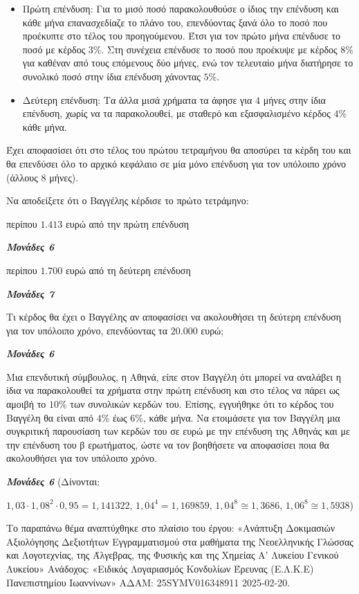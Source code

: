 \documentclass[11pt,a4paper,twoside]{book}
\newcommand{\monades}[1]{
\hspace*{\fill}
\textbf{\textit{\textcolor{maincolor}{Μονάδες #1}}}}
\begin{document}
\begin{itemize}
\item
  Πρώτη επένδυση: Για το μισό ποσό παρακολουθούσε ο ίδιος την επένδυση και κάθε μήνα επανασχεδίαζε το πλάνο του, επενδύοντας ξανά όλο το ποσό που προέκυπτε στο τέλος του προηγούμενου. Έτσι για τον πρώτο μήνα επένδυσε το ποσό με κέρδος $3\%$. Στη συνέχεια επένδυσε το ποσό που προέκυψε με κέρδος $8\%$ για καθέναν από τους επόμενους δύο μήνες, ενώ τον τελευταίο μήνα διατήρησε το συνολικό ποσό στην ίδια επένδυση χάνοντας $5$\%.
\item
  Δεύτερη επένδυση: Τα άλλα μισά χρήματα τα άφησε για $4$ μήνες στην ίδια επένδυση, χωρίς να τα παρακολουθεί, με σταθερό και εξασφαλισμένο κέρδος $4\%$ κάθε μήνα.
\end{itemize}

Έχει αποφασίσει ότι στο τέλος του πρώτου τετραμήνου θα αποσύρει τα κέρδη του και θα επενδύσει όλο το αρχικό κεφάλαιο σε μία μόνο επένδυση για τον υπόλοιπο χρόνο (άλλους $8$ μήνες).

\begin{alist}
\item Να αποδείξετε ότι ο Βαγγέλης κέρδισε το πρώτο τετράμηνο:

\begin{rlist}
\item περίπου $1.413$ ευρώ από την πρώτη επένδυση
\monades{6}
\item περίπου $1.700$ ευρώ από τη δεύτερη επένδυση
\monades{7}
\end{rlist}
\item Τι κέρδος θα έχει ο Βαγγέλης αν αποφασίσει να ακολουθήσει τη δεύτερη επένδυση για τον υπόλοιπο χρόνο, επενδύοντας τα $20.000$ ευρώ;
\monades{6}
\item Μια επενδυτική σύμβουλος, η Αθηνά, είπε στον Βαγγέλη ότι μπορεί να αναλάβει η ίδια να παρακολουθεί τα χρήματα στην πρώτη επένδυση και στο τέλος να πάρει ως αμοιβή το $10$\% των συνολικών κερδών του. Επίσης, εγγυήθηκε ότι το κέρδος του Βαγγέλη θα είναι από $4$\% έως $6$\%, κάθε μήνα. Να ετοιμάσετε για τον Βαγγέλη μια συγκριτική παρουσίαση των κερδών του σε ευρώ με την επένδυση της Αθηνάς και με την επένδυση του β ερωτήματος, ώστε να τον βοηθήσετε να αποφασίσει ποια θα ακολουθήσει για τον υπόλοιπο χρόνο.
\monades{6}
(Δίνονται:

$1,03 \cdot {1,08}^{2} \cdot 0,95 = 1,141322$, ${1,04}^{4} = 1,169859$, ${1,04}^{8} \cong 1,3686$, ${1,06}^{8} \cong 1,5938$)

{\footnotesize Το παραπάνω θέμα αναπτύχθηκε στο πλαίσιο του έργου: «Ανάπτυξη Δοκιμασιών Αξιολόγησης Δεξιοτήτων Εγγραμματισμού στα μαθήματα της Νεοελληνικής Γλώσσας και Λογοτεχνίας, της Άλγεβρας, της Φυσικής και της Χημείας Α' Λυκείου Γενικού Λυκείου» Ανάδοχος: «Ειδικός Λογαριασμός Κονδυλίων Έρευνας (Ε.Λ.Κ.Ε) Πανεπιστημίου Ιωαννίνων» ΑΔΑΜ: 25SYMV016348911 2025-02-20.}
\end{alist}
\end{document}
